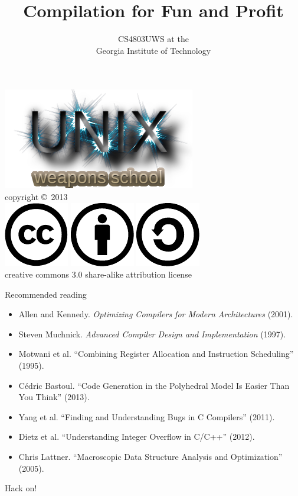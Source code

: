 \documentclass[mathserif,xcolor={dvipsnames,table}]{beamer}
\title{\textbf{Compilation for Fun and Profit}}
\date{}
\author{CS4803UWS at the\\
Georgia Institute of Technology
}
\begin{document}
\begin{frame}
\titlepage
\begin{center}
\includegraphics[scale=0.33]{images/uws.png}\\
\vspace{.1in}
\tiny{copyright \copyright\ 2013}\\
\includegraphics[scale=.25]{images/cc-logo.pdf}
\includegraphics[scale=.25]{images/cc-new.pdf}
\includegraphics[scale=.25]{images/cc-share.pdf}\\
\tiny{creative commons 3.0 share-alike attribution license}
\end{center}
\end{frame}

\begin{frame}{Recommended reading}
\tiny{
\begin{itemize}
\item Allen and Kennedy. \textit{Optimizing Compilers for Modern Architectures} (2001).
\item Steven Muchnick. \textit{Advanced Compiler Design and Implementation} (1997).
\item Motwani et al. ``Combining Register Allocation and Instruction Scheduling'' (1995).
\item C\'{e}dric Bastoul. ``Code Generation in the Polyhedral Model Is Easier Than You Think'' (2013).
\item Yang et al. ``Finding and Understanding Bugs in C Compilers'' (2011).
\item Dietz et al. ``Understanding Integer Overflow in C/C++'' (2012).
\item Chris Lattner. ``Macroscopic Data Structure Analysis and Optimization'' (2005).
\end{itemize}
}
\end{frame}

\begin{frame}{Hack on!}
\end{frame}
\end{document}
